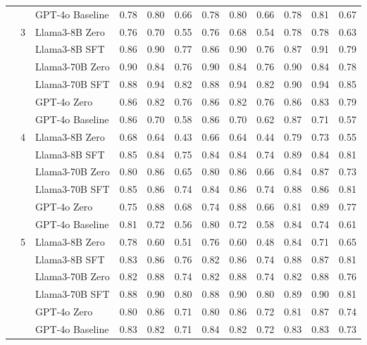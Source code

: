 \begin{longtable}[t]{ll>{}l|rr>{}r|rr>{}r|rrr}
 &  & GPT-4o Baseline & 0.78 & 0.80 & 0.66 & 0.78 & 0.80 & 0.66 & 0.78 & 0.81 & 0.67\\
\cmidrule{2-12}
 & 3 & Llama3-8B Zero & 0.76 & 0.70 & 0.55 & 0.76 & 0.68 & 0.54 & 0.78 & 0.78 & 0.63\\

 &  & Llama3-8B SFT & 0.86 & 0.90 & 0.77 & 0.86 & 0.90 & 0.76 & 0.87 & 0.91 & 0.79\\

 &  & Llama3-70B Zero & 0.90 & 0.84 & 0.76 & 0.90 & 0.84 & 0.76 & 0.90 & 0.84 & 0.78\\

 &  & Llama3-70B SFT & 0.88 & 0.94 & 0.82 & 0.88 & 0.94 & 0.82 & 0.90 & 0.94 & 0.85\\

 &  & GPT-4o Zero & 0.86 & 0.82 & 0.76 & 0.86 & 0.82 & 0.76 & 0.86 & 0.83 & 0.79\\

 &  & GPT-4o Baseline & 0.86 & 0.70 & 0.58 & 0.86 & 0.70 & 0.62 & 0.87 & 0.71 & 0.57\\
\cmidrule{2-12}
 & 4 & Llama3-8B Zero & 0.68 & 0.64 & 0.43 & 0.66 & 0.64 & 0.44 & 0.79 & 0.73 & 0.55\\

 &  & Llama3-8B SFT & 0.85 & 0.84 & 0.75 & 0.84 & 0.84 & 0.74 & 0.89 & 0.84 & 0.81\\

 &  & Llama3-70B Zero & 0.80 & 0.86 & 0.65 & 0.80 & 0.86 & 0.66 & 0.84 & 0.87 & 0.73\\

 &  & Llama3-70B SFT & 0.85 & 0.86 & 0.74 & 0.84 & 0.86 & 0.74 & 0.88 & 0.86 & 0.81\\

 &  & GPT-4o Zero & 0.75 & 0.88 & 0.68 & 0.74 & 0.88 & 0.66 & 0.81 & 0.89 & 0.77\\

 &  & GPT-4o Baseline & 0.81 & 0.72 & 0.56 & 0.80 & 0.72 & 0.58 & 0.84 & 0.74 & 0.61\\
\cmidrule{2-12}
 & 5 & Llama3-8B Zero & 0.78 & 0.60 & 0.51 & 0.76 & 0.60 & 0.48 & 0.84 & 0.71 & 0.65\\

 &  & Llama3-8B SFT & 0.83 & 0.86 & 0.76 & 0.82 & 0.86 & 0.74 & 0.88 & 0.87 & 0.81\\

 &  & Llama3-70B Zero & 0.82 & 0.88 & 0.74 & 0.82 & 0.88 & 0.74 & 0.82 & 0.88 & 0.76\\

 &  & Llama3-70B SFT & 0.88 & 0.90 & 0.80 & 0.88 & 0.90 & 0.80 & 0.89 & 0.90 & 0.81\\

 &  & GPT-4o Zero & 0.80 & 0.86 & 0.71 & 0.80 & 0.86 & 0.72 & 0.81 & 0.87 & 0.74\\

 &  & GPT-4o Baseline & 0.83 & 0.82 & 0.71 & 0.84 & 0.82 & 0.72 & 0.83 & 0.83 & 0.73\\*
\end{longtable}
